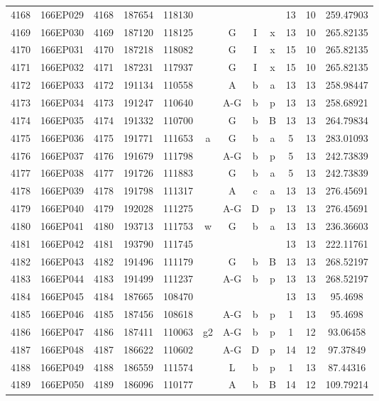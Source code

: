 \begin{tabular}{|*{12}{c|}}
4168 & 166EP029 & 4168 & 187654 & 118130 &  &  &  &  & 13 & 10 & 259.47903 \\ 
4169 & 166EP030 & 4169 & 187120 & 118125 &  & G & I & x & 13 & 10 & 265.82135 \\ 
4170 & 166EP031 & 4170 & 187218 & 118082 &  & G & I & x & 15 & 10 & 265.82135 \\ 
4171 & 166EP032 & 4171 & 187231 & 117937 &  & G & I & x & 15 & 10 & 265.82135 \\ 
4172 & 166EP033 & 4172 & 191134 & 110558 &  & A & b & a & 13 & 13 & 258.98447 \\ 
4173 & 166EP034 & 4173 & 191247 & 110640 &  & A-G & b & p & 13 & 13 & 258.68921 \\ 
4174 & 166EP035 & 4174 & 191332 & 110700 &  & G & b & B & 13 & 13 & 264.79834 \\ 
4175 & 166EP036 & 4175 & 191771 & 111653 & a & G & b & a & 5 & 13 & 283.01093 \\ 
4176 & 166EP037 & 4176 & 191679 & 111798 &  & A-G & b & p & 5 & 13 & 242.73839 \\ 
4177 & 166EP038 & 4177 & 191726 & 111883 &  & G & b & a & 5 & 13 & 242.73839 \\ 
4178 & 166EP039 & 4178 & 191798 & 111317 &  & A & c & a & 13 & 13 & 276.45691 \\ 
4179 & 166EP040 & 4179 & 192028 & 111275 &  & A-G & D & p & 13 & 13 & 276.45691 \\ 
4180 & 166EP041 & 4180 & 193713 & 111753 & w & G & b & a & 13 & 13 & 236.36603 \\ 
4181 & 166EP042 & 4181 & 193790 & 111745 &  &  &  &  & 13 & 13 & 222.11761 \\ 
4182 & 166EP043 & 4182 & 191496 & 111179 &  & G & b & B & 13 & 13 & 268.52197 \\ 
4183 & 166EP044 & 4183 & 191499 & 111237 &  & A-G & b & p & 13 & 13 & 268.52197 \\ 
4184 & 166EP045 & 4184 & 187665 & 108470 &  &  &  &  & 13 & 13 & 95.4698 \\ 
4185 & 166EP046 & 4185 & 187456 & 108618 &  & A-G & b & p & 1 & 13 & 95.4698 \\ 
4186 & 166EP047 & 4186 & 187411 & 110063 & g2 & A-G & b & p & 1 & 12 & 93.06458 \\ 
4187 & 166EP048 & 4187 & 186622 & 110602 &  & A-G & D & p & 14 & 12 & 97.37849 \\ 
4188 & 166EP049 & 4188 & 186559 & 111574 &  & L & b & p & 1 & 13 & 87.44316 \\ 
4189 & 166EP050 & 4189 & 186096 & 110177 &  & A & b & B & 14 & 12 & 109.79214 \\ 

\end{tabular}
